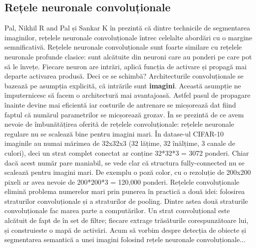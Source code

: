 \subsection{Rețele neuronale convoluționale}
Pal, Nikhil R and Pal și Sankar K în \cite{pal1993review} prezintă că dintre technicile de segmentarea imaginilor, rețelele neuronale convoluționale întrec celelalte abordări cu o margine semnificativă.\newline
Rețelele neuronale convoluționale sunt foarte similare cu rețelele neuronale profunde clasice: sunt alcătuite din neuroni care au ponderi pe care pot să le învețe. Fiecare neuron are intrări, aplică funcția de activare și propagă mai departe activarea produsă.\newline
Deci ce se schimbă? Architecturile convoluționale se bazează pe asumpția explicită, că intrările sunt \textbf{imagini}. Această asumpție ne împuternicesc să facem o architectură mai avantajoasă. Astfel pasul de propagare înainte devine mai eficientă iar costurile de antrenare se micșorează dat fiind faptul că numărul parametrilor se micșorează grozav.
În \cite{csfromuniversity} se prezintă de ce avem nevoie de îmbunătățirea oferită de rețelele convoluționale: rețelele neuronale regulare nu se scalează bine pentru imagini mari. În datase-ul CIFAR-10 imaginile au numai mărimea de 32x32x3 (32 lățime, 32 înălțime, 3 canale de culori), deci un strat complet conectat ar conține 32*32*3 = 3072 ponderi. Chiar dacă acest număr pare maniabil, se vede clar că structura fully-connected nu se scalează pentru imagini mari. De exemplu o poză color, cu o rezoluție de 200x200 pixeli ar avea nevoie de 200*200*3 = 120,000 ponderi.\newline
Rețelele convoluționale elimină problema numerelor mari prin punerea în practică a două idei: folosirea straturilor convoluționale și a straturilor de pooling. Dintre astea două straturile convoluționale fac marea parte a computărilor. Un strat convoluțional este alcătuit de fapt de în set de filtre; fiecare extrage trăsăturile corespunzătoare lui, și construieste o mapă de activări.\newline
Acum să vorbim despre detecția de obiecte și segmentarea semantică a unei imagini folosind rețele neuronale convoluționale...
